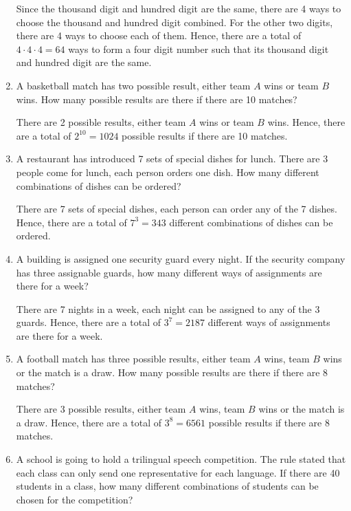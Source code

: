 \documentclass{report}
\begin{document}
\begin{multicols}{2}
\begin{enumerate}
          Since the thousand digit and hundred digit are the same, there are 4 ways to
          choose the thousand and hundred digit combined. For the other two digits, there
          are 4 ways to choose each of them. Hence, there are a total of $4 \cdot 4 \cdot
            4 = 64$ ways to form a four digit number such that its thousand digit and
          hundred digit are the same.

    \item A basketball match has two possible result, either team $A$ wins or team $B$
          wins. How many possible results are there if there are 10 matches? \sol{}

          There are 2 possible results, either team $A$ wins or team $B$ wins. Hence,
          there are a total of $2^{10} = 1024$ possible results if there are 10 matches.

    \item A restaurant has introduced 7 sets of special dishes for lunch. There are 3
          people come for lunch, each person orders one dish. How many different
          combinations of dishes can be ordered? \sol{}

          There are 7 sets of special dishes, each person can order any of the 7 dishes.
          Hence, there are a total of $7^3 = 343$ different combinations of dishes can be
          ordered.

    \item A building is assigned one security guard every night. If the security company
          has three assignable guards, how many different ways of assignments are there
          for a week? \sol{}

          There are 7 nights in a week, each night can be assigned to any of the 3
          guards. Hence, there are a total of $3^7 = 2187$ different ways of assignments
          are there for a week.

    \item A football match has three possible results, either team $A$ wins, team $B$
          wins or the match is a draw. How many possible results are there if there are 8
          matches?

          There are 3 possible results, either team $A$ wins, team $B$ wins or the match
          is a draw. Hence, there are a total of $3^{8} = 6561$ possible results if there
          are 8 matches.

    \item A school is going to hold a trilingual speech competition. The rule stated that
          each class can only send one representative for each language. If there are 40
          students in a class, how many different combinations of students can be chosen
          for the competition? \sol{}


\end{enumerate}
\end{multicols}
\end{document}
